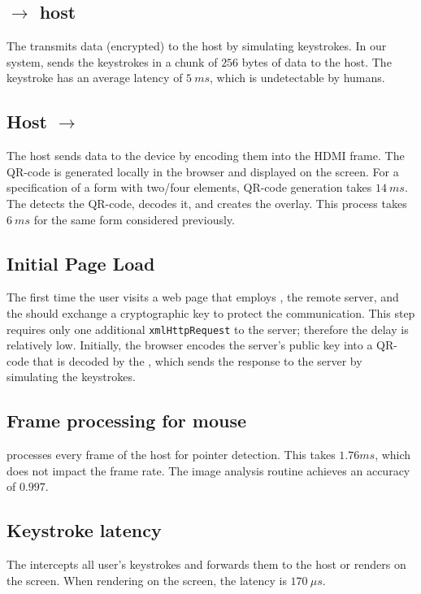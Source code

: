 \subsection{\device $\rightarrow$ host} The \device transmits data (encrypted) to the host by simulating keystrokes. In our system, \device sends the keystrokes in a chunk of $256$ bytes of data to the host. The keystroke has an average latency of $5\ ms$, which is undetectable by humans.  


\subsection{Host $\rightarrow$ \device} The host sends data to the device by encoding them into the HDMI frame. The QR-code is generated locally in the browser and displayed on the screen. For a specification of a form with two/four elements, QR-code generation takes $14\ ms$. The \device detects the QR-code, decodes it, and creates the overlay. This process takes $6\ ms$ for the same form considered previously.
 

\subsection{Initial Page Load} The first time the user visits a web page that employs \name, the remote server, and the \device should exchange a cryptographic key to protect the communication. This step requires only one additional \texttt{xmlHttpRequest} to the server; therefore the delay is relatively low. Initially, the browser encodes the server's public key into a QR-code that is decoded by the \device, which sends the response to the server by simulating the keystrokes.


\subsection{Frame processing for mouse} \device processes every frame of the host for pointer detection. This takes $1.76 ms$, which does not impact the frame rate. The image analysis routine achieves an accuracy of $0.997$. 


\subsection{Keystroke latency} The \device intercepts all user's keystrokes and forwards them to the host or renders on the screen. When rendering on the screen, the latency is $170\ \mu s$.


